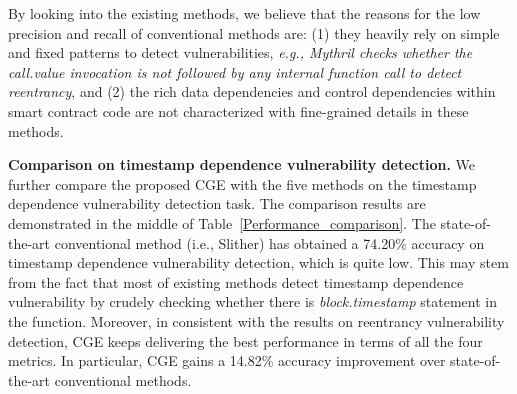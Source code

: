 By looking into the existing methods, we believe that the reasons for the low precision and recall of conventional methods are: (1) they heavily rely on simple and fixed patterns to detect vulnerabilities, \emph{e.g., Mythril checks whether the call.value invocation is not followed by any internal function call to detect reentrancy}, and (2) the rich data dependencies and control dependencies within smart contract code are not characterized with fine-grained details in these methods. 

\textbf{Comparison on timestamp dependence vulnerability detection.} We further compare the proposed CGE with the five methods on the timestamp dependence vulnerability detection task. The comparison results are demonstrated in the middle of Table~\ref{Performance_comparison}. The state-of-the-art conventional method (i.e., Slither) has obtained a 74.20\% accuracy on timestamp dependence vulnerability detection, which is quite low. This may stem from the fact that most of existing methods detect timestamp dependence vulnerability by crudely checking whether there is \emph{block.timestamp} statement in the function. Moreover, in consistent with the results on reentrancy vulnerability detection, CGE keeps delivering the best performance in terms of all the four metrics. In particular, CGE gains a 14.82\% accuracy improvement over state-of-the-art conventional methods.

